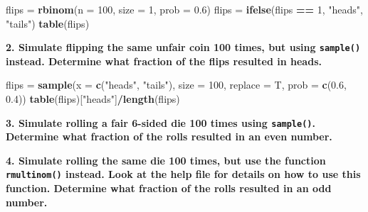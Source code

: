 \documentclass[]{book}
\newenvironment{Shaded}{\begin{snugshade}}{\end{snugshade}}
\newcommand{\KeywordTok}[1]{\textcolor[rgb]{0.13,0.29,0.53}{\textbf{#1}}}
\newcommand{\DataTypeTok}[1]{\textcolor[rgb]{0.13,0.29,0.53}{#1}}
\newcommand{\DecValTok}[1]{\textcolor[rgb]{0.00,0.00,0.81}{#1}}
\newcommand{\FloatTok}[1]{\textcolor[rgb]{0.00,0.00,0.81}{#1}}
\newcommand{\StringTok}[1]{\textcolor[rgb]{0.31,0.60,0.02}{#1}}
\newcommand{\OperatorTok}[1]{\textcolor[rgb]{0.81,0.36,0.00}{\textbf{#1}}}
\newcommand{\NormalTok}[1]{#1}
\theoremstyle{definition}
\theoremstyle{definition}
\theoremstyle{definition}
\theoremstyle{remark}
\begin{document}
\begin{Shaded}
\begin{Highlighting}[]
\NormalTok{flips =}\StringTok{ }\KeywordTok{rbinom}\NormalTok{(}\DataTypeTok{n =} \DecValTok{100}\NormalTok{, }\DataTypeTok{size =} \DecValTok{1}\NormalTok{, }\DataTypeTok{prob =} \FloatTok{0.6}\NormalTok{)}
\NormalTok{flips =}\StringTok{ }\KeywordTok{ifelse}\NormalTok{(flips }\OperatorTok{==}\StringTok{ }\DecValTok{1}\NormalTok{, }\StringTok{"heads"}\NormalTok{, }\StringTok{"tails"}\NormalTok{)}
\KeywordTok{table}\NormalTok{(flips)}
\end{Highlighting}
\end{Shaded}

\textbf{2. Simulate flipping the same unfair coin 100 times, but using
\texttt{sample()} instead. Determine what fraction of the flips resulted
in heads.}

\begin{Shaded}
\begin{Highlighting}[]
\NormalTok{flips =}\StringTok{ }\KeywordTok{sample}\NormalTok{(}\DataTypeTok{x =} \KeywordTok{c}\NormalTok{(}\StringTok{"heads"}\NormalTok{, }\StringTok{"tails"}\NormalTok{), }\DataTypeTok{size =} \DecValTok{100}\NormalTok{, }\DataTypeTok{replace =}\NormalTok{ T, }\DataTypeTok{prob =} \KeywordTok{c}\NormalTok{(}\FloatTok{0.6}\NormalTok{, }\FloatTok{0.4}\NormalTok{))}
\KeywordTok{table}\NormalTok{(flips)[}\StringTok{"heads"}\NormalTok{]}\OperatorTok{/}\KeywordTok{length}\NormalTok{(flips)}
\end{Highlighting}
\end{Shaded}

\textbf{3. Simulate rolling a fair 6-sided die 100 times using
\texttt{sample()}. Determine what fraction of the rolls resulted in an
even number.}

\begin{Shaded}
\end{Shaded}

\textbf{4. Simulate rolling the same die 100 times, but use the function
\texttt{rmultinom()} instead. Look at the help file for details on how
to use this function. Determine what fraction of the rolls resulted in
an odd number.}
\end{document}
